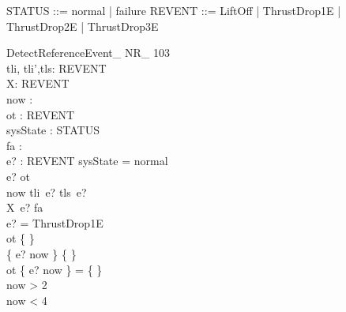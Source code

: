 \begin{zed}
STATUS ::= normal | failure \also
REVENT ::= LiftOff | ThrustDrop1E | ThrustDrop2E | ThrustDrop3E \also
[SENSOR]
\end{zed}



\begin{schema}{DetectReferenceEvent\_ NR\_ 103}\\
tli, tli',tls: REVENT \fun \nat \\
X: REVENT \fun \nat \\
 now : \nat \\
 ot : REVENT \pfun \nat \\
 sysState : STATUS \\
 fa : \nat \\
 e? : REVENT 
\where
 sysState = normal \\
 e? \notin \dom ot \\
 now \in tli~e? \upto tls~e? \\
 X~e? \geq fa \\
 e? = ThrustDrop1E \\
 ot \neq \{ \} \\
 \{ e? \mapsto now \} \neq \{ \} \\
 ot \cap \{ e? \mapsto now \} = \{ \} \\
 now > 2 \\
 now < 4
\end{schema}

